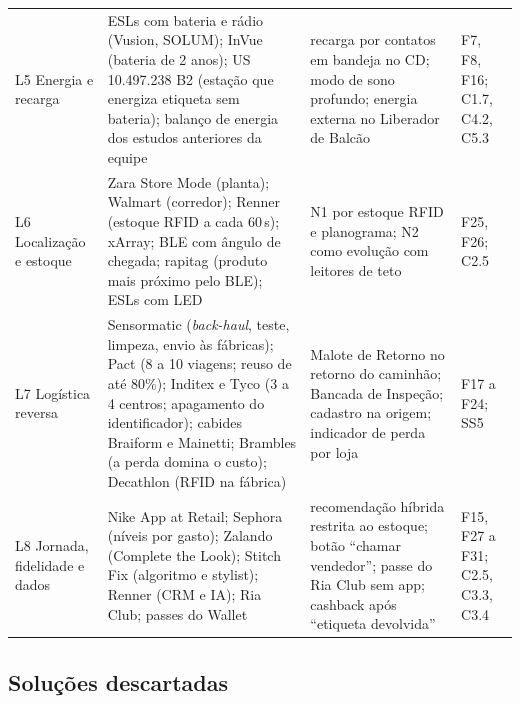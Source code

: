 \begin{longtable}{@{}
    >{\RaggedRight\arraybackslash}p{2.2cm}
    >{\RaggedRight\arraybackslash}p{5.3cm}
    >{\RaggedRight\arraybackslash}p{4.6cm}
    >{\RaggedRight\arraybackslash}p{2.5cm}@{}}
\addlinespace
L5 Energia e recarga & ESLs com bateria e rádio (Vusion, SOLUM); InVue (bateria de 2 anos); US 10.497.238 B2 (estação que energiza etiqueta sem bateria); balanço de energia dos estudos anteriores da equipe & recarga por contatos em bandeja no CD; modo de sono profundo; energia externa no Liberador de Balcão & F7, F8, F16; C1.7, C4.2, C5.3 \\
\addlinespace
L6 Localização e estoque & Zara Store Mode (planta); Walmart (corredor); Renner (estoque RFID a cada 60\,s); xArray; BLE com ângulo de chegada; rapitag (produto mais próximo pelo BLE); ESLs com LED & N1 por estoque RFID e planograma; N2 como evolução com leitores de teto & F25, F26; C2.5 \\
\addlinespace
L7 Logística reversa & Sensormatic (\textit{back-haul}, teste, limpeza, envio às fábricas); Pact (8 a 10 viagens; reuso de até 80\%); Inditex e Tyco (3 a 4 centros; apagamento do identificador); cabides Braiform e Mainetti; Brambles (a perda domina o custo); Decathlon (RFID na fábrica) & Malote de Retorno no retorno do caminhão; Bancada de Inspeção; cadastro na origem; indicador de perda por loja & F17 a F24; SS5 \\
\addlinespace
L8 Jornada, fidelidade e dados & Nike App at Retail; Sephora (níveis por gasto); Zalando (Complete the Look); Stitch Fix (algoritmo e stylist); Renner (CRM e IA); Ria Club; passes do Wallet & recomendação híbrida restrita ao estoque; botão ``chamar vendedor''; passe do Ria Club sem app; cashback após ``etiqueta devolvida'' & F15, F27 a F31; C2.5, C3.3, C3.4 \\
\end{longtable}
\endgroup

\subsection{Soluções descartadas}
\label{sub:r2-aprov-descartadas}

